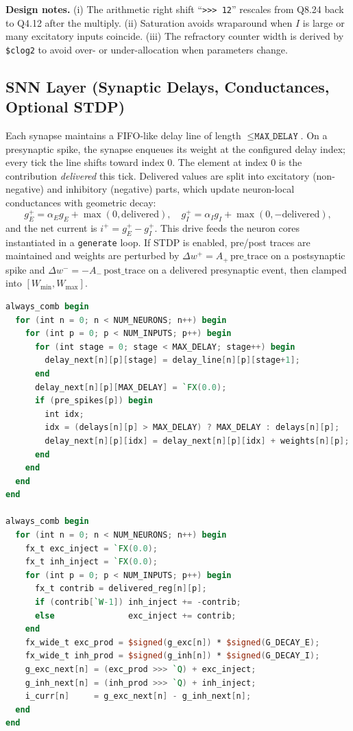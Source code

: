 \documentclass[10pt,onecolumn]{IEEEtran}
\begin{document}
\noindent
\textbf{Design notes.} (i) The arithmetic right shift ``\verb|>>> 12|'' rescales from Q8.24 back to Q4.12 after the multiply. (ii) Saturation avoids wraparound when \(I\) is large or many excitatory inputs coincide. (iii) The refractory counter width is derived by \verb|$clog2| to avoid over- or under-allocation when parameters change.


\subsection{SNN Layer (Synaptic Delays, Conductances, Optional STDP)}
\label{sec:layer}

Each synapse maintains a FIFO-like delay line of length \(\le \texttt{MAX\_DELAY}\). On a presynaptic spike, the synapse enqueues its weight at the configured delay index; every tick the line shifts toward index \(0\). The element at index \(0\) is the contribution \emph{delivered} this tick. Delivered values are split into excitatory (non-negative) and inhibitory (negative) parts, which update neuron-local conductances with geometric decay:
\[
g_E^{+} = \alpha_E g_E + \max(0, \text{delivered}),\quad
g_I^{+} = \alpha_I g_I + \max(0, -\text{delivered}),
\]
and the net current is \(i^{+}=g_E^{+}-g_I^{+}\). This drive feeds the neuron cores instantiated in a \verb|generate| loop. If STDP is enabled, pre/post traces are maintained and weights are perturbed by \(\Delta w^+ = A_+\,\text{pre\_trace}\) on a postsynaptic spike and \(\Delta w^- = -A_-\,\text{post\_trace}\) on a delivered presynaptic event, then clamped into \([W_{\min}, W_{\max}]\).

\begin{lstlisting}[language=Verilog,basicstyle=\ttfamily\small,caption={Delay pipeline and conductance update excerpt from the SNN layer.},label={lst:layer}]
always_comb begin
  for (int n = 0; n < NUM_NEURONS; n++) begin
    for (int p = 0; p < NUM_INPUTS; p++) begin
      for (int stage = 0; stage < MAX_DELAY; stage++) begin
        delay_next[n][p][stage] = delay_line[n][p][stage+1];
      end
      delay_next[n][p][MAX_DELAY] = `FX(0.0);
      if (pre_spikes[p]) begin
        int idx;
        idx = (delays[n][p] > MAX_DELAY) ? MAX_DELAY : delays[n][p];
        delay_next[n][p][idx] = delay_next[n][p][idx] + weights[n][p];
      end
    end
  end
end

always_comb begin
  for (int n = 0; n < NUM_NEURONS; n++) begin
    fx_t exc_inject = `FX(0.0);
    fx_t inh_inject = `FX(0.0);
    for (int p = 0; p < NUM_INPUTS; p++) begin
      fx_t contrib = delivered_reg[n][p];
      if (contrib[`W-1]) inh_inject += -contrib;
      else               exc_inject += contrib;
    end
    fx_wide_t exc_prod = $signed(g_exc[n]) * $signed(G_DECAY_E);
    fx_wide_t inh_prod = $signed(g_inh[n]) * $signed(G_DECAY_I);
    g_exc_next[n] = (exc_prod >>> `Q) + exc_inject;
    g_inh_next[n] = (inh_prod >>> `Q) + inh_inject;
    i_curr[n]     = g_exc_next[n] - g_inh_next[n];
  end
end
\end{lstlisting}
\end{document}

